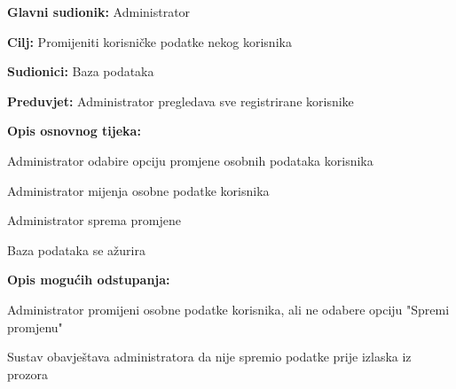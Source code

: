 				\noindent {}
				\begin{packed_item}
					
					\item \textbf{Glavni sudionik: }Administrator
					\item  \textbf{Cilj:} Promijeniti korisničke podatke nekog korisnika
					\item  \textbf{Sudionici:} Baza podataka
					\item  \textbf{Preduvjet:} Administrator pregledava sve registrirane korisnike
					\item  \textbf{Opis osnovnog tijeka:}
					
					\item[] \begin{packed_enum}
						
						\item Administrator odabire opciju promjene osobnih podataka korisnika
						\item Administrator mijenja osobne podatke korisnika
						\item Administrator sprema promjene
						\item Baza podataka se ažurira
					\end{packed_enum}
					
					\item  \textbf{Opis mogućih odstupanja:}
					
					\item[] \begin{packed_item}
						
						\item[2.a] Administrator promijeni osobne podatke korisnika, ali ne odabere opciju "Spremi promjenu"
						\item[] \begin{packed_enum}
							
							\item Sustav obavještava administratora da nije spremio podatke prije izlaska iz prozora\\
							
						\end{packed_enum}
					\end{packed_item}
				\end{packed_item}
			\noindent {}

